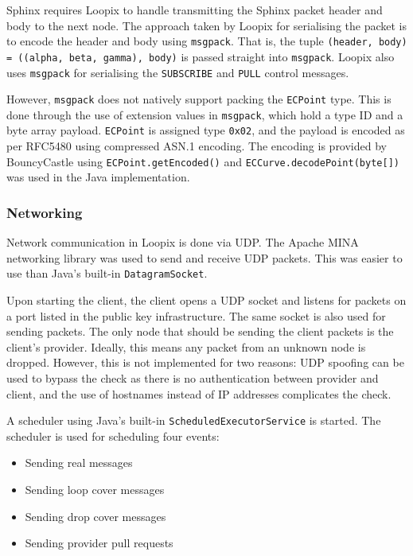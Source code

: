 \documentclass[final,dissertation.tex]{subfiles}
\begin{document}
Sphinx requires Loopix to handle transmitting the Sphinx packet header and body to the next node. The approach taken by Loopix for serialising the packet is to encode the header and body using \verb|msgpack|. That is, the tuple \verb|(header, body) = ((alpha, beta, gamma), body)| is passed straight into \verb|msgpack|. Loopix also uses \verb|msgpack| for serialising the \verb|SUBSCRIBE| and \verb|PULL| control messages.

However, \verb|msgpack| does not natively support packing the \verb|ECPoint| type. This is done through the use of extension values in \verb|msgpack|, which hold a type ID and a byte array payload. \verb|ECPoint| is assigned type \verb|0x02|, and the payload is encoded as per RFC5480 \cite{RFC5480} using compressed ASN.1 encoding. The encoding is provided by BouncyCastle using \verb|ECPoint.getEncoded()| and \verb|ECCurve.decodePoint(byte[])| was used in the Java implementation.

\subsubsection{Networking}

Network communication in Loopix is done via UDP. The Apache MINA networking library was used to send and receive UDP packets. This was easier to use than Java's built-in \verb|DatagramSocket|. 

Upon starting the client, the client opens a UDP socket and listens for packets on a port listed in the public key infrastructure. The same socket is also used for sending packets. The only node that should be sending the client packets is the client's provider. Ideally, this means any packet from an unknown node is dropped. However, this is not implemented for two reasons: UDP spoofing can be used to bypass the check as there is no authentication between provider and client, and the use of hostnames instead of IP addresses complicates the check.

A scheduler using Java's built-in \verb|ScheduledExecutorService| is started. The scheduler is used for scheduling four events:

\begin{itemize}
	\item Sending real messages
	\item Sending loop cover messages
	\item Sending drop cover messages
	\item Sending provider pull requests
\end{itemize}
\end{document}
